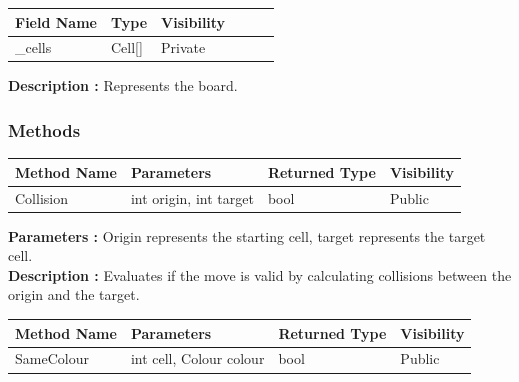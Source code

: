 \documentclass[12pt]{article}
\begin{document}
\begin{table}[H]
    \begin{tabular}{llllll}
    \hline
    \multicolumn{1}{|l|}{\cellcolor[HTML]{EFEFEF}\textbf{Field Name}} & \multicolumn{1}{l|}{\cellcolor[HTML]{EFEFEF}\textbf{Type}} & \multicolumn{1}{l|}{\cellcolor[HTML]{EFEFEF}\textbf{Visibility}} \\ \hline
    \multicolumn{1}{|l|}{\_cells}                                     & \multicolumn{1}{l|}{Cell[]}                                & \multicolumn{1}{l|}{Private}                                     \\ \hline
    \end{tabular}
\end{table}

\textbf{Description :}  Represents the board. 

\subsubsection{Methods}

\begin{table}[H]
    \begin{tabular}{|l|l|l|l|}
    \hline
    \rowcolor[HTML]{EFEFEF} 
    \cellcolor[HTML]{EFEFEF}\textbf{Method Name} & \textbf{Parameters}    & \textbf{Returned Type} & \textbf{Visibility} \\ \hline
    Collision                                    & int origin, int target & bool                   & Public              \\ \hline
    \end{tabular}
\end{table}

\textbf{Parameters :} Origin represents the starting cell, target represents the target cell. 
\\

\textbf{Description :} Evaluates if the move is valid by calculating collisions between the origin and the target. 

\begin{table}[H]
    \begin{tabular}{|l|l|l|l|}
    \hline
    \rowcolor[HTML]{EFEFEF} 
    \cellcolor[HTML]{EFEFEF}\textbf{Method Name} & \textbf{Parameters}     & \textbf{Returned Type} & \textbf{Visibility} \\ \hline
    SameColour                                   & int cell, Colour colour & bool                   & Public              \\ \hline
    \end{tabular}
\end{table}
\end{document}
